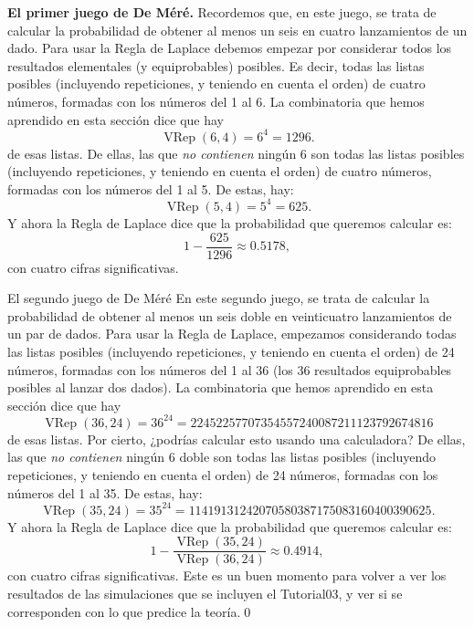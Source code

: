 \begin{Ejemplo}{\bf El primer juego de De Méré.}\label{cap03:ejem:DeMere01}
    Recordemos que, en este juego, se trata de calcular la probabilidad de obtener al menos un seis en cuatro lanzamientos de un dado. Para usar la Regla de Laplace debemos empezar por considerar todos los resultados elementales (y equiprobables) posibles. Es decir, todas las listas posibles (incluyendo repeticiones, y teniendo en cuenta el orden) de  cuatro números, formadas con los números del 1 al 6. La combinatoria que hemos aprendido en esta sección dice que hay
    \[\operatorname{VRep}(6,4)=6^4=1296.\]
    de esas listas. De ellas, las que {\em no contienen} ningún 6 son todas las listas posibles (incluyendo repeticiones, y teniendo en cuenta el orden) de cuatro números,  formadas con los números del 1 al 5. De estas, hay:
    \[\operatorname{VRep}(5,4)=5^4=625.\]
    Y ahora la Regla de Laplace dice que la probabilidad que queremos calcular es:
    \[1-\dfrac{625}{1296}\approx 0.5178,\]
    con cuatro cifras significativas.
\end{Ejemplo}

\begin{Ejemplo}{El segundo juego de De Méré}\label{cap03:ejem:DeMere02}
    En este segundo juego, se trata de calcular la probabilidad de obtener al menos un seis doble en veinticuatro lanzamientos de un par de dados. Para usar la Regla de Laplace, empezamos considerando todas las listas posibles (incluyendo repeticiones, y teniendo en cuenta el orden) de  24 números, formadas con los números del 1 al 36 (los 36 resultados equiprobables posibles al lanzar dos dados). La combinatoria que hemos aprendido en esta sección dice que hay
    \[\operatorname{VRep}(36,24)=36^{24}=22452257707354557240087211123792674816\]
    de esas listas. Por cierto, ¿podrías calcular esto usando una calculadora? De ellas, las que {\em no contienen} ningún 6 doble son todas las listas posibles (incluyendo repeticiones, y teniendo en cuenta el orden) de 24 números,  formadas con los números del 1 al 35. De estas, hay:
    \[\operatorname{VRep}(35,24)=35^{24}=11419131242070580387175083160400390625.\]
    Y ahora la Regla de Laplace dice que la probabilidad que queremos calcular es:
    \[1-\dfrac{\operatorname{VRep}(35,24)}{\operatorname{VRep}(36,24)}\approx 0.4914,\]
    con cuatro cifras significativas. Este es un buen momento para volver a ver los resultados de las simulaciones que se incluyen el Tutorial03, y ver si se corresponden con lo que predice la teoría.\qed
\end{Ejemplo}

